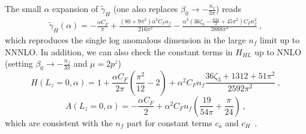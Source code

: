 \documentclass[a4paper,11pt]{article}
\begin{document}
The small $\alpha$ expansion of $\tilde \gamma_H$ (one also replaces $\beta_0 \rightarrow -\frac{n_f}{3\pi}$) reads
\begin{align}
    \tilde \gamma_{H}(\alpha) = -\frac{\alpha  C_F}{\pi }+\frac{\left(80+9 \pi ^2\right) \alpha ^2 C_F n_f}{216 \pi ^2}-\frac{\alpha ^3 \left(36 \zeta_3-\frac{844}{3}+45 \pi ^2\right)C_F n_f^2}{3888 \pi ^3} \ , 
\end{align}
which reproduces the single log anomalous dimension in the large $n_f$ limit up to NNNLO.  In addition, we can also check the constant terms in $H_{HL}$ up to NNLO (setting $\beta_0 \rightarrow -\frac{n_f}{3\pi}$ and $\mu=2 p^z$)
\begin{equation}
H(L_z=0,\alpha) = 1 + \frac{\alpha  C_F}{2 \pi }\left( \frac{\pi ^2}{12}-2 \right) + \alpha^2 C_F n_f \frac{36 \zeta_3+1312+51 \pi ^2}{2592 \pi ^2} \ ,
\end{equation}
\begin{equation}
A(L_z=0,\alpha)  = - \frac{\alpha C_F}{2}  + \alpha^2 C_F n_f \left(\frac{19}{54 \pi }+\frac{\pi }{24}\right)  \ ,
\end{equation}
which are consistent with the $n_f$ part for constant terms $c_a$ and $c_H$~\cite{Ji:2023pba}.
\end{document}
